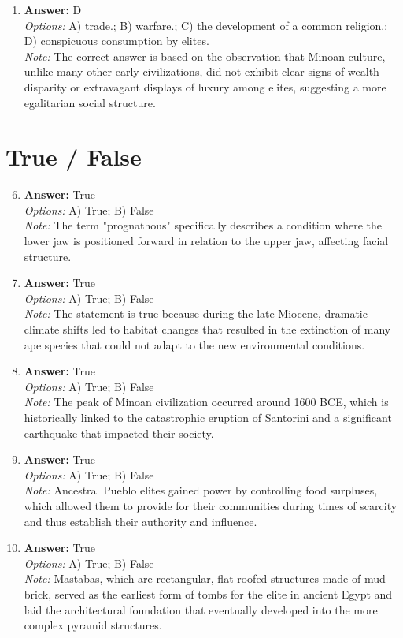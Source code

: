 \documentclass[12pt]{article}
\begin{document}
\begin{enumerate}[label=\arabic*.]
\\ \textit{Note:} A hand axe is a more complex and advanced tool than an Oldowan tool, necessitating the removal of many more flakes to achieve its refined shape and sharp edges.
\item \textbf{Answer:} D
\\ \textit{Options:} A) trade.; B) warfare.; C) the development of a common religion.; D) conspicuous consumption by elites.
\\ \textit{Note:} The correct answer is based on the observation that Minoan culture, unlike many other early civilizations, did not exhibit clear signs of wealth disparity or extravagant displays of luxury among elites, suggesting a more egalitarian social structure.
\end{enumerate}

\section*{True / False}
\begin{enumerate}[label=\arabic*.]
\setcounter{enumi}{5}
\item \textbf{Answer:} True
\\ \textit{Options:} A) True; B) False
\\ \textit{Note:} The term "prognathous" specifically describes a condition where the lower jaw is positioned forward in relation to the upper jaw, affecting facial structure.
\item \textbf{Answer:} True
\\ \textit{Options:} A) True; B) False
\\ \textit{Note:} The statement is true because during the late Miocene, dramatic climate shifts led to habitat changes that resulted in the extinction of many ape species that could not adapt to the new environmental conditions.
\item \textbf{Answer:} True
\\ \textit{Options:} A) True; B) False
\\ \textit{Note:} The peak of Minoan civilization occurred around 1600 BCE, which is historically linked to the catastrophic eruption of Santorini and a significant earthquake that impacted their society.
\item \textbf{Answer:} True
\\ \textit{Options:} A) True; B) False
\\ \textit{Note:} Ancestral Pueblo elites gained power by controlling food surpluses, which allowed them to provide for their communities during times of scarcity and thus establish their authority and influence.
\item \textbf{Answer:} True
\\ \textit{Options:} A) True; B) False
\\ \textit{Note:} Mastabas, which are rectangular, flat-roofed structures made of mud-brick, served as the earliest form of tombs for the elite in ancient Egypt and laid the architectural foundation that eventually developed into the more complex pyramid structures.
\end{enumerate}
\end{document}
